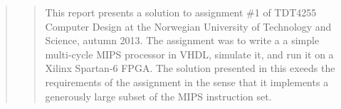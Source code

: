 \begin{quote}
\begin{quote}
This report presents a solution to assignment \#1 of TDT4255 Computer Design at the Norwegian University of Technology and Science, autumn 2013.
The assignment was to write a a simple multi-cycle MIPS processor in VHDL, simulate it, and run it on a Xilinx Spartan-6 FPGA.
The solution presented in this exeeds the requirements of the assignment in the sense that it implements a generously large subset of the MIPS instruction set.
\end{quote}
\end{quote}
